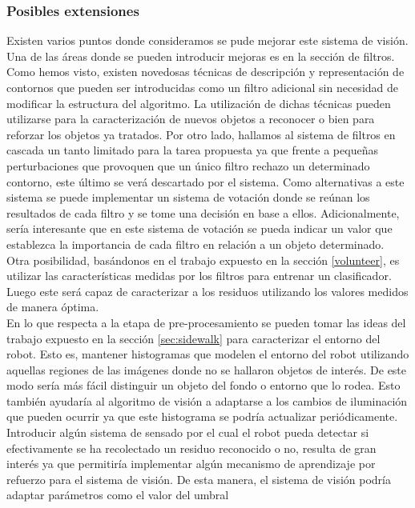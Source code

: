 \subsubsection{Posibles extensiones}
Existen varios puntos donde consideramos se pude mejorar este sistema 
de visión. Una de las áreas donde se pueden introducir mejoras es en 
la sección de filtros. Como hemos visto, existen novedosas técnicas de 
descripción y representación de contornos que pueden ser introducidas 
como un filtro adicional sin necesidad de modificar la estructura del 
algoritmo. La utilización de dichas técnicas pueden utilizarse para 
la caracterización de nuevos objetos a reconocer o bien para reforzar 
los objetos ya tratados. Por otro lado, hallamos al sistema de filtros 
en cascada un tanto limitado para la tarea propuesta ya que frente a 
pequeñas perturbaciones que provoquen que un único filtro rechazo un 
determinado contorno, este último se verá descartado por el sistema. 
Como alternativas a este sistema se puede implementar un sistema de 
votación donde se reúnan los resultados de cada filtro y se tome una 
decisión en base a ellos. Adicionalmente, sería interesante que en 
este sistema de votación se pueda indicar un valor que establezca la 
importancia de cada filtro en relación a un objeto determinado. Otra 
posibilidad, basándonos en el trabajo \cite{potato} expuesto en la 
sección \ref{volunteer}, es utilizar las 
características medidas por los filtros para entrenar un clasificador. 
Luego este será capaz de caracterizar a los residuos utilizando los 
valores medidos de manera óptima.\\
\indent En lo que respecta a la etapa de pre-procesamiento se pueden 
tomar las ideas del trabajo \cite{sidewalk2008} expuesto en la sección \ref{sec:sidewalk} 
para caracterizar el entorno del robot. Esto es, mantener histogramas 
que modelen el entorno del robot utilizando aquellas regiones de las 
imágenes donde no se hallaron  objetos de interés. De este modo sería más fácil 
distinguir un objeto del fondo o entorno que lo rodea. Esto también 
ayudaría al algoritmo de visión a adaptarse a los cambios de 
iluminación que pueden ocurrir ya que este histograma se podría 
actualizar periódicamente.\\
\indent Introducir algún sistema de sensado por el cual el robot pueda 
detectar si efectivamente se ha recolectado un residuo reconocido o no, resulta de 
gran interés ya que permitiría implementar algún mecanismo de 
aprendizaje por refuerzo para el sistema de visión. De esta manera, el 
sistema de visión podría adaptar parámetros como el valor del umbral 

